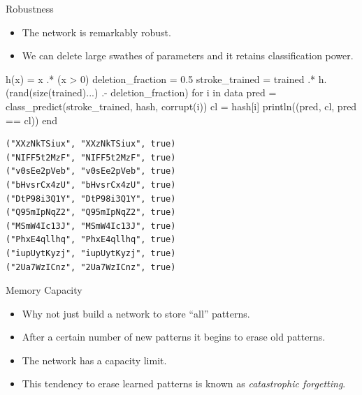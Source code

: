 \documentclass[
  ignorenonframetext,
]{beamer}
\newenvironment{Shaded}{\begin{snugshade}}{\end{snugshade}}
\newcommand{\ControlFlowTok}[1]{\textcolor[rgb]{0.00,0.23,0.31}{#1}}
\newcommand{\FloatTok}[1]{\textcolor[rgb]{0.68,0.00,0.00}{#1}}
\newcommand{\FunctionTok}[1]{\textcolor[rgb]{0.28,0.35,0.67}{#1}}
\newcommand{\KeywordTok}[1]{\textcolor[rgb]{0.00,0.23,0.31}{#1}}
\newcommand{\NormalTok}[1]{\textcolor[rgb]{0.00,0.23,0.31}{#1}}
\newcommand{\OperatorTok}[1]{\textcolor[rgb]{0.37,0.37,0.37}{#1}}
\begin{document}
\begin{frame}[fragile]{Robustness}
\protect\hypertarget{robustness}{}
\begin{itemize}
\item
  The network is remarkably robust.
\item
  We can delete large swathes of parameters and it retains
  classification power.
\end{itemize}

\begin{Shaded}
\begin{Highlighting}[]
\FunctionTok{h}\NormalTok{(x) }\OperatorTok{=}\NormalTok{ x }\OperatorTok{.*}\NormalTok{ (x }\OperatorTok{\textgreater{}} \FloatTok{0}\NormalTok{)}
\NormalTok{deletion\_fraction }\OperatorTok{=} \FloatTok{0.5}
\NormalTok{stroke\_trained }\OperatorTok{=}\NormalTok{ trained }\OperatorTok{.*} \FunctionTok{h}\NormalTok{.(}\FunctionTok{rand}\NormalTok{(}\FunctionTok{size}\NormalTok{(trained)}\OperatorTok{...}\NormalTok{) }\OperatorTok{.{-}}\NormalTok{ deletion\_fraction)}
\ControlFlowTok{for}\NormalTok{ i }\KeywordTok{in}\NormalTok{ data}
\NormalTok{    pred }\OperatorTok{=} \FunctionTok{class\_predict}\NormalTok{(stroke\_trained, hash, }\FunctionTok{corrupt}\NormalTok{(i))}
\NormalTok{    cl }\OperatorTok{=}\NormalTok{ hash[i]}
    \FunctionTok{println}\NormalTok{((pred, cl, pred }\OperatorTok{==}\NormalTok{ cl))}
\ControlFlowTok{end}
\end{Highlighting}
\end{Shaded}

\begin{verbatim}
("XXzNkTSiux", "XXzNkTSiux", true)
("NIFF5t2MzF", "NIFF5t2MzF", true)
("v0sEe2pVeb", "v0sEe2pVeb", true)
("bHvsrCx4zU", "bHvsrCx4zU", true)
("DtP98i3Q1Y", "DtP98i3Q1Y", true)
("Q95mIpNqZ2", "Q95mIpNqZ2", true)
("MSmW4Ic13J", "MSmW4Ic13J", true)
("PhxE4qllhq", "PhxE4qllhq", true)
("iupUytKyzj", "iupUytKyzj", true)
("2Ua7WzICnz", "2Ua7WzICnz", true)
\end{verbatim}
\end{frame}

\begin{frame}{Memory Capacity}
\protect\hypertarget{memory-capacity}{}
\begin{itemize}
\item
  Why not just build a network to store ``all'' patterns.
\item
  After a certain number of new patterns it begins to erase old
  patterns.
\item
  The network has a capacity limit.
\item
  This tendency to erase learned patterns is known as \emph{catastrophic
  forgetting}.
\end{itemize}
\end{frame}
\end{document}
